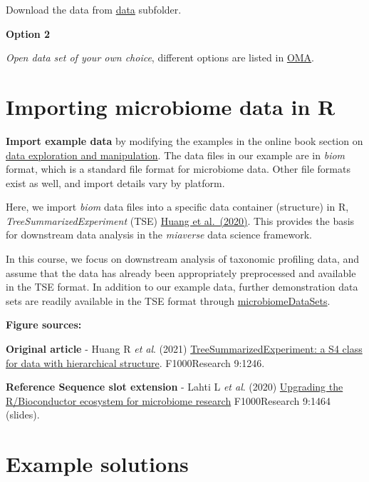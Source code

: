 \documentclass[
  oneside]{book}
\begin{document}
Download the data from
\href{https://github.com/microbiome/course_2022_radboud/tree/main/data}{data}
subfolder.

\textbf{Option 2}

\emph{Open data set of your own choice}, different options are listed in \href{https://microbiome.github.io/OMA/containers.html\#example-data}{OMA}.

\hypertarget{importing-microbiome-data-in-r}{%
\section{Importing microbiome data in R}\label{importing-microbiome-data-in-r}}

\textbf{Import example data} by modifying the examples in the online book
section on \href{https://microbiome.github.io/OMA/data-introduction.html\#loading-experimental-microbiome-data}{data exploration and
manipulation}. The
data files in our example are in \emph{biom} format, which is a standard
file format for microbiome data. Other file formats exist as well, and
import details vary by platform.

Here, we import \emph{biom} data files into a specific data container (structure)
in R, \emph{TreeSummarizedExperiment} (TSE) \href{https://f1000research.com/articles/9-1246}{Huang et
al.~(2020)}. This provides
the basis for downstream data analysis in the \emph{miaverse} data science
framework.

In this course, we focus on downstream analysis of taxonomic profiling
data, and assume that the data has already been appropriately
preprocessed and available in the TSE format. In addition to our
example data, further demonstration data sets are readily available in
the TSE format through
\href{https://bioconductor.org/packages/release/data/experiment/html/microbiomeDataSets.html}{microbiomeDataSets}.

\textbf{Figure sources:}

\textbf{Original article}
- Huang R \emph{et al}. (2021) \href{https://doi.org/10.12688/\%20f1000research.26669.2}{TreeSummarizedExperiment: a S4 class
for data with hierarchical structure}. F1000Research 9:1246.

\textbf{Reference Sequence slot extension}
- Lahti L \emph{et al}. (2020) \href{https://doi.org/10.7490/\%20f1000research.1118447.1}{Upgrading the R/Bioconductor ecosystem for microbiome
research} F1000Research 9:1464 (slides).

\hypertarget{example-solutions}{%
\section{Example solutions}\label{example-solutions}}
\end{document}

